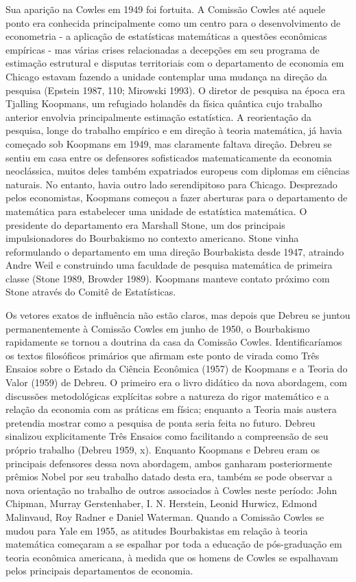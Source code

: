 \documentclass[a4paper,12pt]{article}[abntex2]
\begin{document}
Sua aparição na Cowles em 1949 foi fortuita. A Comissão Cowles até aquele ponto era conhecida principalmente como um centro para o desenvolvimento de econometria - a aplicação de estatísticas matemáticas a questões econômicas empíricas - mas várias crises relacionadas a decepções em seu programa de estimação estrutural e disputas territoriais com o departamento de economia em Chicago estavam fazendo a unidade contemplar uma mudança na direção da pesquisa (Epstein 1987, 110; Mirowski 1993). O diretor de pesquisa na época era Tjalling Koopmans, um refugiado holandês da física quântica cujo trabalho anterior envolvia principalmente estimação estatística. A reorientação da pesquisa, longe do trabalho empírico e em direção à teoria matemática, já havia começado sob Koopmans em 1949, mas claramente faltava direção. Debreu se sentiu em casa entre os defensores sofisticados matematicamente da economia neoclássica, muitos deles também expatriados europeus com diplomas em ciências naturais. No entanto, havia outro lado serendipitoso para Chicago. Desprezado pelos economistas, Koopmans começou a fazer aberturas para o departamento de matemática para estabelecer uma unidade de estatística matemática. O presidente do departamento era Marshall Stone, um dos principais impulsionadores do Bourbakismo no contexto americano. Stone vinha reformulando o departamento em uma direção Bourbakista desde 1947, atraindo Andre Weil e construindo uma faculdade de pesquisa matemática de primeira classe (Stone 1989, Browder 1989). Koopmans manteve contato próximo com Stone através do Comitê de Estatísticas.

Os vetores exatos de influência não estão claros, mas depois que Debreu se juntou permanentemente à Comissão Cowles em junho de 1950, o Bourbakismo rapidamente se tornou a doutrina da casa da Comissão Cowles. Identificaríamos os textos filosóficos primários que afirmam este ponto de virada como Três Ensaios sobre o Estado da Ciência Econômica (1957) de Koopmans e a Teoria do Valor (1959) de Debreu. O primeiro era o livro didático da nova abordagem, com discussões metodológicas explícitas sobre a natureza do rigor matemático e a relação da economia com as práticas em física; enquanto a Teoria mais austera pretendia mostrar como a pesquisa de ponta seria feita no futuro. Debreu sinalizou explicitamente Três Ensaios como facilitando a compreensão de seu próprio trabalho (Debreu 1959, x). Enquanto Koopmans e Debreu eram os principais defensores dessa nova abordagem, ambos ganharam posteriormente prêmios Nobel por seu trabalho datado desta era, também se pode observar a nova orientação no trabalho de outros associados à Cowles neste período: John Chipman, Murray Gerstenhaber, I. N. Herstein, Leonid Hurwicz, Edmond Malinvaud, Roy Radner e Daniel Waterman. Quando a Comissão Cowles se mudou para Yale em 1955, as atitudes Bourbakistas em relação à teoria matemática começaram a se espalhar por toda a educação de pós-graduação em teoria econômica americana, à medida que os homens de Cowles se espalhavam pelos principais departamentos de economia.
\end{document}
